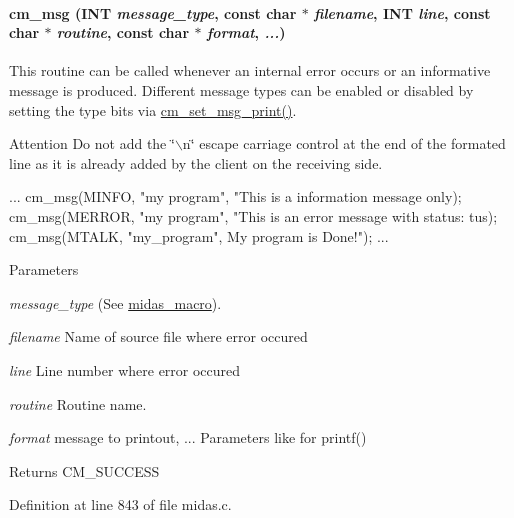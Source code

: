 \paragraph[{cm\_\-msg}]{ cm\_\-msg ({\bf INT} {\em message\_\-type}, \/  const char $\ast$ {\em filename}, \/  {\bf INT} {\em line}, \/  const char $\ast$ {\em routine}, \/  const char $\ast$ {\em format}, \/   {\em ...})}\hfill\label{group__msgfunctionc_gaac032ca2438c47466bfc9722de6746ea}
This routine can be called whenever an internal error occurs or an informative message is produced. Different message types can be enabled or disabled by setting the type bits via \hyperlink{group__msgfunctionc_gafe6ff62436845805cd87a7ea1bd3b4dd}{cm\_\-set\_\-msg\_\-print()}. \begin{DoxyAttention}{Attention}
Do not add the \char`\"{}$\backslash$n\char`\"{} escape carriage control at the end of the formated line as it is already added by the client on the receiving side. 
\begin{DoxyCode}
   ...
   cm_msg(MINFO, "my program", "This is a information message only);
   cm_msg(MERROR, "my program", "This is an error message with status:%
      tus);
   cm_msg(MTALK, "my_program", My program is Done!");
   ...
\end{DoxyCode}
 
\end{DoxyAttention}

\begin{DoxyParams}{Parameters}
\item[{\em message\_\-type}](See \hyperlink{F_Midas_Code_and_Libraries_midas_macro}{midas\_\-macro}). \item[{\em filename}]Name of source file where error occured \item[{\em line}]Line number where error occured \item[{\em routine}]Routine name. \item[{\em format}]message to printout, ... Parameters like for printf() \end{DoxyParams}
\begin{DoxyReturn}{Returns}
CM\_\-SUCCESS 
\end{DoxyReturn}


Definition at line 843 of file midas.c.


